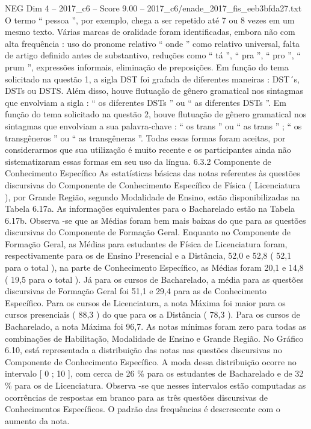 \begin{textsample}{NEG Dim 4 – 2017\_c6 – Score 9.00 – 2017\_c6/enade\_2017\_fis\_eeb3bfda27.txt}
O termo “ pessoa ”, por exemplo, chega a ser repetido até 7 ou 8 vezes em um mesmo texto.
Várias marcas de oralidade foram identificadas, embora não com alta frequência : uso do pronome relativo “ onde ” como relativo universal, falta de artigo definido antes de substantivo, reduções como “ tá ”, “ pra ”, “ pro ”, “ prum ”, expressões informais, eliminação de preposições.
Em função do tema solicitado na questão 1, a sigla DST foi grafada de diferentes maneiras : DST´s, DSTs ou DSTS.
Além disso, houve flutuação de gênero gramatical nos sintagmas que envolviam a sigla : “ os diferentes DSTs ” ou “ as diferentes DSTs ”.
Em função do tema solicitado na questão 2, houve flutuação de gênero gramatical nos sintagmas que envolviam a sua palavra-chave : “ os trans ” ou “ as trans ” ; “ os transgêneros ” ou “ as transgêneras ”.
Todas essas formas foram aceitas, por considerarmos que sua utilização é muito recente e os participantes ainda não sistematizaram essas formas em seu uso da língua. 6.3.2 Componente de Conhecimento Específico As estatísticas básicas das notas referentes às questões discursivas do Componente de Conhecimento Específico de Física ( Licenciatura ), por Grande Região, segundo Modalidade de Ensino, estão disponibilizadas na Tabela 6.17a.
As informações equivalentes para o Bacharelado estão na Tabela 6.17b.
Observa -se que as Médias foram bem mais baixas do que para as questões discursivas do Componente de Formação Geral.
Enquanto no Componente de Formação Geral, as Médias para estudantes de Física de Licenciatura foram, respectivamente para os de Ensino Presencial e a Distância, 52,0 e 52,8 ( 52,1 para o total ), na parte de Conhecimento Específico, as Médias foram 20,1 e 14,8 ( 19,5 para o total ).
Já para os cursos de Bacharelado, a média para as questões discursivas de Formação Geral foi 51,1 e 29,4 para as de Conhecimento Específico.
Para os cursos de Licenciatura, a nota Máxima foi maior para os cursos presenciais ( 88,3 ) do que para os a Distância ( 78,3 ).
Para os cursos de Bacharelado, a nota Máxima foi 96,7.
As notas mínimas foram zero para todas as combinações de Habilitação, Modalidade de Ensino e Grande Região.
No Gráfico 6.10, está representada a distribuição das notas nas questões discursivas no Componente de Conhecimento Específico.
A moda dessa distribuição ocorre no intervalo [ 0 ; 10 ], com cerca de 26 \% para os estudantes de Bacharelado e de 32 \% para os de Licenciatura.
Observa -se que nesses intervalos estão computadas as ocorrências de respostas em branco para as três questões discursivas de Conhecimentos Específicos.
O padrão das frequências é descrescente com o aumento da nota.

\end{textsample}
